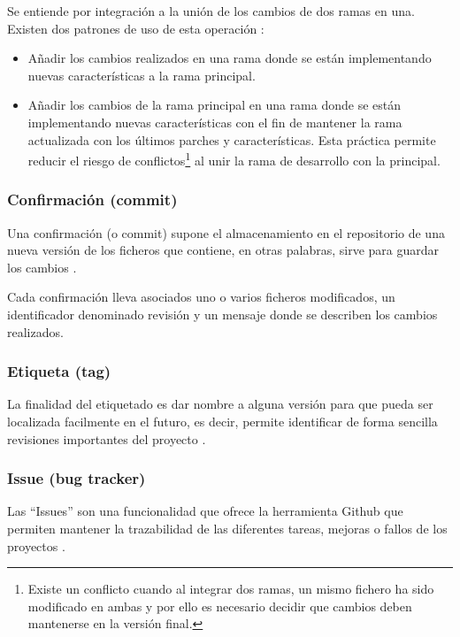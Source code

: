 Se entiende por integración a la unión de los cambios de dos ramas en una. Existen dos patrones de uso de esta operación \cite{sbf5:git3}:

\begin{itemize}
	\item Añadir los cambios realizados en una rama donde se están implementando nuevas características a la rama principal.
	\item Añadir los cambios de la rama principal en una rama donde se están implementando nuevas características con el fin de mantener la rama actualizada con los últimos parches y características. Esta práctica permite reducir el riesgo de conflictos\footnote{Existe un conflicto cuando al integrar dos ramas, un mismo fichero ha sido modificado en ambas y por ello es necesario decidir que cambios deben mantenerse en la versión final.} al unir la rama de desarrollo con la principal.
\end{itemize}

\subsubsection{Confirmación (commit)}

Una confirmación (o commit) supone el almacenamiento en el repositorio de una nueva versión de los ficheros que contiene, en otras palabras, sirve para guardar los cambios \cite{Chacon:2014:PG:2695634}.

Cada confirmación lleva asociados uno o varios ficheros modificados, un identificador denominado revisión y un mensaje donde se describen los cambios realizados.

\subsubsection{Etiqueta (tag)}

La finalidad del etiquetado es dar nombre a alguna versión para que pueda ser localizada facilmente en el futuro, es decir, permite identificar de forma sencilla revisiones importantes del proyecto \cite{wiki:002}.

\subsubsection{Issue (bug tracker)}

Las ``Issues'' son una funcionalidad que ofrece la herramienta Github que permiten mantener la trazabilidad de las diferentes tareas, mejoras o fallos de los proyectos .

